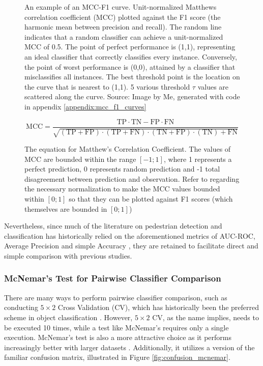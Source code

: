\begin{figure}
    \centering
    
    \caption{An example of an MCC-F1 curve. Unit-normalized Matthews correlation coefficient (MCC) plotted against the F1 score (the harmonic mean between precision and recall). The random line indicates that a random classifier can achieve a unit-normalized MCC of 0.5. The point of perfect performance is (1,1), representing an ideal classifier that correctly classifies every instance. Conversely, the point of worst performance is (0,0), attained by a classifier that misclassifies all instances. The best threshold point is the location on the curve that is nearest to (1,1). 5 various threshold $\tau$ values are scattered along the curve. Source: Image by Me, generated with code in appendix \ref{appendix:mcc_f1_curves}}
    \label{fig:mcc_f1_example}
\end{figure}


\begin{figure}
    $$\mathrm{MCC} = \frac{\mathrm{TP}\cdot\mathrm{TN}-\mathrm{FP}\cdot\mathrm{FN}}{\sqrt{(\mathrm{TP}+\mathrm{FP})\cdot(\mathrm{TP}+\mathrm{FN})\cdot(\mathrm{TN}+\mathrm{FP})\cdot(\mathrm{TN})+\mathrm{FN}}}$$ 
    \caption{The equation for Matthew's Correlation Coefficient. The values of MCC are bounded within the range $[-1;1]$, where 1 represents a perfect prediction, 0 represents random prediction and -1 total disagreement between prediction and observation. Refer to \cite{chicco_jurman_2020_mcc_f1} regarding the necessary normalization to make the MCC values bounded within $[0;1]$ so that they can be plotted against F1 scores (which themselves are bounded in $[0;1]$)}
\end{figure}

Nevertheless, since much of the literature on pedestrian detection and classification has historically relied on the aforementioned metrics of AUC-ROC, Average Precision and simple Accuracy \cite{dalal_2005_histograms} \cite{dollar_2012_pedestrian}, they are retained to facilitate direct and simple comparison with previous studies.

\subsubsection{McNemar's Test for Pairwise Classifier Comparison}

There are many ways to perform pairwise classifier comparison, such as conducting $5 \times 2$ Cross Validation (CV), which has historically been the preferred scheme in object classification \cite{dietterich_1998_mcnemar}. However, $5 \times 2$ CV, as the name implies, needs to be executed 10 times, while a test like McNemar's requires only a single execution. McNemar's test is also a more attractive choice as it performs increasingly better with larger datasets \cite{raschka_2018_mcnemar}. Additionally, it utilizes a version of the familiar confusion matrix, illustrated in Figure \ref{fig:confusion_mcnemar}.

